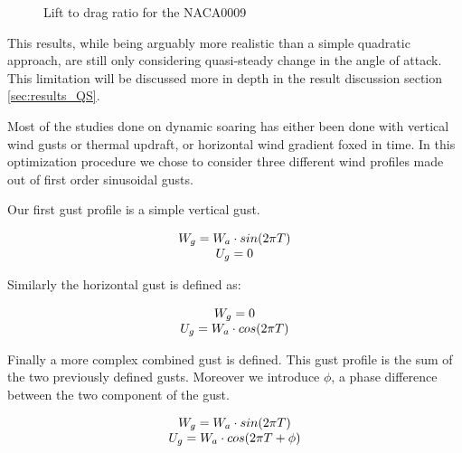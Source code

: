 \begin{figure}[ht]
\begin{center}
\end{center}
\caption{Lift to drag ratio for the NACA0009}
\label{fig:G_vs_alpha_qs}
\end{figure}

\par This results, while being arguably more realistic than a simple quadratic approach, are still only considering quasi-steady change in the angle of attack.
This limitation will be discussed more in depth in the result discussion section \ref{sec:results_QS}.

Most of the studies done on dynamic soaring has either been done with vertical wind gusts or thermal updraft, or horizontal wind gradient foxed in time.
In this optimization procedure we chose to consider three different wind profiles made out of first order sinusoidal gusts.

\par Our first gust profile is a simple vertical gust.

\begin{equation}
\begin{array}[c]{c}
  W_g = W_a \cdot sin(2\pi T) \\
  U_g = 0 
\end{array}
\label{eqn:vertical_gust_definition}
\end{equation}

\par Similarly the horizontal gust is defined as:

\begin{equation}
\begin{array}[c]{c}
  W_g = 0 \\
  U_g = W_a \cdot cos(2 \pi T)
\end{array}
\label{eqn:horizontal_gust_definition}
\end{equation}

\par Finally a more complex combined gust is defined.
This gust profile is the sum of the two previously defined gusts.
Moreover we introduce $\phi$, a phase difference between the two component of the gust. 

\begin{equation}
\begin{array}[c]{c}
  W_g = W_a \cdot sin(2\pi T) \\
  U_g = W_a \cdot cos(2 \pi T + \phi)
\end{array}
\label{eqn:combined_gust_definition}
\end{equation}

